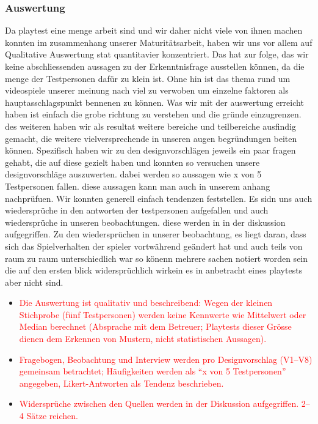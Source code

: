 \documentclass[../Main.tex]{subfiles}
\begin{document}
\subsubsection{Auswertung} \label{sec:Auswertung}
Da playtest eine menge arbeit sind und wir daher nicht viele von ihnen machen konnten im zusammenhang unserer Maturitätsarbeit, haben wir uns vor allem auf Qualitative Auswertung stat quantitavier konzentriert. Das hat zur folge, das wir keine abschliessenden aussagen zu der Erkenntnisfrage ausstellen können, da die menge der Testpersonen dafür zu klein ist. Ohne hin ist das thema rund um videospiele unserer meinung nach viel zu verwoben um einzelne faktoren als hauptasschlagspunkt bennenen zu können. Was wir mit der auswertung erreicht haben ist einfach die grobe richtung zu verstehen und die gründe einzugrenzen. des weiteren haben wir als resultat weitere bereiche und teilbereiche ausfindig gemacht, die weitere vielversprechende in unseren augen begründungen beiten können. Spezifisch haben wir zu den designvorschlägen jeweils ein paar fragen gehabt, die auf diese gezielt haben und konnten so versuchen unsere designvorschläge auszuwerten. dabei werden so aussagen wie x von 5 Testpersonen fallen. diese aussagen kann man auch in unserem anhang nachprüfuen. Wir konnten generell einfach tendenzen feststellen. Es sidn uns auch wiedersprüche in den antworten der testpersonen aufgefallen und auch wiedersprüche in unseren beobachtungen. diese werden in in der diskussion aufgegriffen. Zu den wiedersprüchen in unserer beobachtung, es liegt daran, dass sich das Spielverhalten der spieler vortwährend geändert hat und auch teils von raum zu raum unterschiedlich war so könenn mehrere sachen notiert worden sein die auf den ersten blick widersprüchlich wirkein es in anbetracht eines playtests aber nicht sind.
\begin{itemize}[leftmargin=1.5cm]
    \item \textcolor{red}{Die Auswertung ist qualitativ und beschreibend: Wegen der kleinen Stichprobe (fünf Testpersonen) werden keine Kennwerte wie Mittelwert oder Median berechnet (Absprache mit dem Betreuer; Playtests dieser Grösse dienen dem Erkennen von Mustern, nicht statistischen Aussagen).}
    \item \textcolor{red}{Fragebogen, Beobachtung und Interview werden pro Designvorschlag (V1--V8) gemeinsam betrachtet; Häufigkeiten werden als \enquote{x von 5 Testpersonen} angegeben, Likert-Antworten als Tendenz beschrieben.}
    \item \textcolor{red}{Widersprüche zwischen den Quellen werden in der Diskussion aufgegriffen. 2--4 Sätze reichen.}
\end{itemize}
\end{document}
